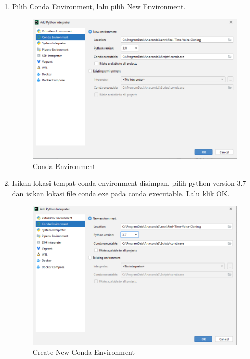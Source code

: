 \begin{enumerate}
\item Pilih Conda Environment, lalu pilih New Environment.
\begin{figure}[H]
\centering
\includegraphics[scale=.4]{figures/cenv3}
\caption{Conda Environment}
\label{cenv3}
\end{figure}

\item Isikan lokasi tempat conda environment disimpan, pilih python version 3.7  dan isikan lokasi file conda.exe pada conda executable. Lalu klik OK. 
\begin{figure}[H]
\centering
\includegraphics[scale=.4]{figures/cenv4}
\caption{Create New Conda Environment}
\label{cenv4}
\end{figure}


\end{enumerate}
